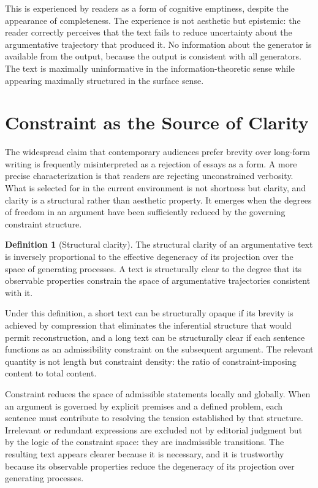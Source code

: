 \documentclass[12pt, oneside]{article}
\theoremstyle{plain}
\theoremstyle{definition}
\newtheorem{definition}[theorem]{Definition}
\theoremstyle{remark}
\begin{document}
This is experienced by readers as a form of cognitive emptiness, despite the appearance of
completeness. The experience is not aesthetic but epistemic: the reader correctly perceives
that the text fails to reduce uncertainty about the argumentative trajectory that produced
it. No information about the generator is available from the output, because the output is
consistent with all generators. The text is maximally uninformative in the
information-theoretic sense while appearing maximally structured in the surface sense.

\section{Constraint as the Source of Clarity}

The widespread claim that contemporary audiences prefer brevity over long-form writing is
frequently misinterpreted as a rejection of essays as a form. A more precise characterization
is that readers are rejecting unconstrained verbosity. What is selected for in the current
environment is not shortness but clarity, and clarity is a structural rather than aesthetic
property. It emerges when the degrees of freedom in an argument have been sufficiently
reduced by the governing constraint structure.

\begin{definition}[Structural clarity]
The structural clarity of an argumentative text is inversely proportional to the effective
degeneracy of its projection over the space of generating processes. A text is structurally
clear to the degree that its observable properties constrain the space of argumentative
trajectories consistent with it.
\end{definition}

Under this definition, a short text can be structurally opaque if its brevity is achieved
by compression that eliminates the inferential structure that would permit reconstruction,
and a long text can be structurally clear if each sentence functions as an admissibility
constraint on the subsequent argument. The relevant quantity is not length but constraint
density: the ratio of constraint-imposing content to total content.

Constraint reduces the space of admissible statements locally and globally. When an argument
is governed by explicit premises and a defined problem, each sentence must contribute to
resolving the tension established by that structure. Irrelevant or redundant expressions are
excluded not by editorial judgment but by the logic of the constraint space: they are
inadmissible transitions. The resulting text appears clearer because it is necessary, and
it is trustworthy because its observable properties reduce the degeneracy of its projection
over generating processes.
\end{document}
